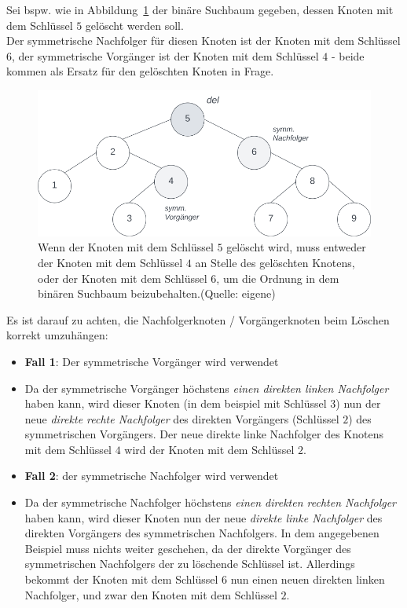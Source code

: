 \noindent
Sei bspw. wie in Abbildung~\ref{fig:deltree} der binäre Suchbaum gegeben, dessen Knoten mit dem Schlüssel $5$ gelöscht werden soll.\\
Der symmetrische Nachfolger für diesen Knoten ist der Knoten mit dem Schlüssel $6$, der symmetrische Vorgänger ist der Knoten mit dem Schlüssel $4$ - beide kommen als Ersatz für den gelöschten Knoten in Frage.\\

\begin{figure}
    \begin{center}
        \includegraphics[scale=0.4]{chapters/Datenstrukturen und Algorithmen/img/deltree}
        \caption{Wenn der Knoten mit dem Schlüssel $5$ gelöscht wird, muss entweder der  Knoten mit dem Schlüssel $4$ an Stelle des gelöschten Knotens, oder der Knoten mit dem Schlüssel $6$, um die Ordnung in dem binären Suchbaum beizubehalten.(Quelle: eigene)}
        \label{fig:deltree}
    \end{center}
\end{figure}

\noindent
Es ist darauf zu achten, die Nachfolgerknoten / Vorgängerknoten beim Löschen korrekt umzuhängen:
\begin{itemize}
    \item \textbf{Fall 1}: Der symmetrische Vorgänger wird verwendet
    \item [] Da der symmetrische Vorgänger höchstens \textit{einen direkten linken Nachfolger} haben kann, wird dieser Knoten (in dem beispiel mit Schlüssel $3$) nun der neue \textit{direkte rechte Nachfolger} des direkten Vorgängers (Schlüssel $2$) des symmetrischen Vorgängers.
    Der neue direkte linke Nachfolger des Knotens mit dem Schlüssel $4$ wird der Knoten mit dem Schlüssel $2$.
    \item \textbf{Fall 2}: der symmetrische Nachfolger wird verwendet
    \item[] Da der symmetrische Nachfolger höchstens \textit{einen direkten rechten Nachfolger} haben kann, wird dieser Knoten nun der neue \textit{direkte linke Nachfolger} des direkten Vorgängers des symmetrischen Nachfolgers.
    In dem angegebenen Beispiel muss nichts weiter geschehen, da der direkte Vorgänger des symmetrischen Nachfolgers der zu löschende Schlüssel ist.
    Allerdings bekommt der Knoten mit dem Schlüssel $6$ nun einen neuen direkten linken Nachfolger, und zwar den Knoten mit dem Schlüssel $2$.
\end{itemize}\\


